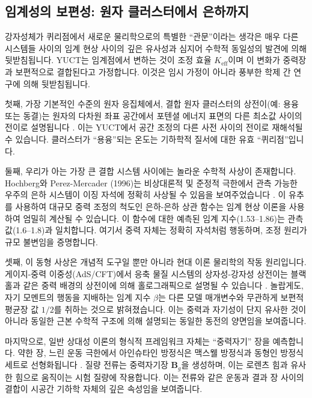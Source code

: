 \documentclass[11pt,a4paper]{article}
\begin{document}
	\subsection{임계성의 보편성: 원자 클러스터에서 은하까지}
	\label{subsec:universality}
	
	강자성체가 퀴리점에서 새로운 물리학으로의 특별한 ``관문''이라는 생각은 매우 다른 시스템들 사이의 임계 현상 사이의 깊은 유사성과 심지어 수학적 동일성의 발견에 의해 뒷받침됩니다. YUCT는 임계점에서 변하는 것이 조정 효율 $K_{\mathrm{eff}}$이며 이 변화가 중력장과 보편적으로 결합된다고 가정합니다. 이것은 임시 가정이 아니라 풍부한 학제 간 연구에 의해 뒷받침됩니다.
	
	첫째, 가장 기본적인 수준의 원자 응집체에서, 결합 원자 클러스터의 상전이(예: 용융 또는 동결)는 원자의 다차원 좌표 공간에서 포텐셜 에너지 표면의 다른 최소값 사이의 전이로 설명됩니다 \cite{Berry2005}. 이는 YUCT에서 공간 조정의 다른 사전 사이의 전이로 재해석될 수 있습니다. 클러스터가 ``용융''되는 온도는 기하학적 질서에 대한 유효 ``퀴리점''입니다.
	
	둘째, 우리가 아는 가장 큰 결합 시스템 사이에는 놀라운 수학적 사상이 존재합니다. Hochberg와 Perez-Mercader (1996)는 비상대론적 및 준정적 극한에서 관측 가능한 우주의 은하 시스템이 이징 자석에 정확히 사상될 수 있음을 보여주었습니다 \cite{Hochberg1996}. 이 유추를 사용하여 대규모 중력 조정의 척도인 은하-은하 상관 함수는 임계 현상 이론을 사용하여 엄밀히 계산될 수 있습니다. 이 함수에 대한 예측된 임계 지수(1.53–1.86)는 관측값(1.6–1.8)과 일치합니다. 여기서 중력 자체는 정확히 자석처럼 행동하며, 조정 원리가 규모 불변임을 증명합니다.
	
	셋째, 이 동형 사상은 개념적 도구일 뿐만 아니라 현대 이론 물리학의 작동 원리입니다. 게이지-중력 이중성(AdS/CFT)에서 응축 물질 시스템의 상자성-강자성 상전이는 블랙홀과 같은 중력 배경의 상전이에 의해 홀로그래픽으로 설명될 수 있습니다 \cite{Ghotbabadi2021, Zbl2021}. 놀랍게도, 자기 모멘트의 행동을 지배하는 임계 지수 $\beta$는 다른 모델 매개변수와 무관하게 보편적 평균장 값 $1/2$를 취하는 것으로 밝혀졌습니다. 이는 중력과 자기성이 단지 유사한 것이 아니라 동일한 근본 수학적 구조에 의해 설명되는 동일한 동전의 양면임을 보여줍니다.
	
	마지막으로, 일반 상대성 이론의 형식적 프레임워크 자체는 ``중력자기'' 장을 예측합니다. 약한 장, 느린 운동 극한에서 아인슈타인 방정식은 맥스웰 방정식과 동형인 방정식 세트로 선형화됩니다 \cite{ciufolini1995}. 질량 전류는 중력자기장 $ \mathbf{B}_g$을 생성하며, 이는 로렌츠 힘과 유사한 힘으로 움직이는 시험 질량에 작용합니다. 이는 전류와 같은 운동과 결과 장 사이의 결합이 시공간 기하학 자체의 깊은 속성임을 보여줍니다.
	
\end{document}
